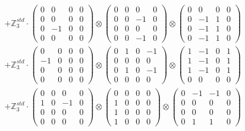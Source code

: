 \documentclass{article}
\begin{document}
{\begin{align}
        &+ \label{Rs13-Rc12-Solution-1-c23} \mathbb{Z}_3^{std} \cdot 
            \begin{pmatrix} 0 & 0 & 0 & 0 \\ 0 & 0 & 0 & 0 \\ 0 & -1 & 0 & 0 \\ 0 & 0 & 0 & 0 \end{pmatrix} \otimes 
            \begin{pmatrix} 0 & 0 & 0 & 0 \\ 0 & 0 & -1 & 0 \\ 0 & 0 & 0 & 0 \\ 0 & 0 & -1 & 0 \end{pmatrix} \otimes 
            \begin{pmatrix} 0 & 0 & 0 & 0 \\ 0 & -1 & 1 & 0 \\ 0 & -1 & 1 & 0 \\ 0 & -1 & 1 & 0 \end{pmatrix} \\ 
        &+ \label{Rs13-Rc12-Solution-1-c24} \mathbb{Z}_3^{std} \cdot 
            \begin{pmatrix} 0 & 0 & 0 & 0 \\ -1 & 0 & 0 & 0 \\ 0 & 0 & 0 & 0 \\ 0 & 0 & 0 & 0 \end{pmatrix} \otimes 
            \begin{pmatrix} 0 & 1 & 0 & -1 \\ 0 & 0 & 0 & 0 \\ 0 & 1 & 0 & -1 \\ 0 & 0 & 0 & 0 \end{pmatrix} \otimes 
            \begin{pmatrix} 1 & -1 & 0 & 1 \\ 1 & -1 & 0 & 1 \\ 1 & -1 & 0 & 1 \\ 0 & 0 & 0 & 0 \end{pmatrix} \\ 
        &+ \label{Rs13-Rc12-Solution-1-c25} \mathbb{Z}_3^{std} \cdot 
            \begin{pmatrix} 0 & 0 & 0 & 0 \\ 1 & 0 & -1 & 0 \\ 0 & 0 & 0 & 0 \\ 0 & 0 & 0 & 0 \end{pmatrix} \otimes 
            \begin{pmatrix} 0 & 0 & 0 & 0 \\ 1 & 0 & 0 & 0 \\ 1 & 0 & 0 & 0 \\ 1 & 0 & 0 & 0 \end{pmatrix} \otimes 
            \begin{pmatrix} 0 & -1 & -1 & 0 \\ 0 & 0 & 0 & 0 \\ 0 & 0 & 0 & 0 \\ 0 & 1 & 1 & 0 \end{pmatrix} 
        \end{align}
        }
        
\end{document}
